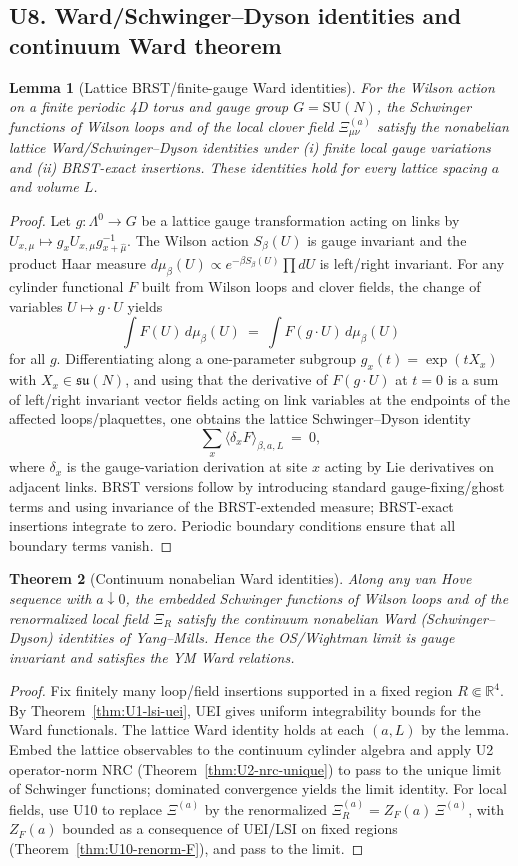 \documentclass[11pt]{amsart}
\theoremstyle{plain}
\newtheorem{theorem}{Theorem}[section]
\newtheorem{lemma}[theorem]{Lemma}
\theoremstyle{definition}
\theoremstyle{remark}
\begin{document}
\subsection{U8. Ward/Schwinger–Dyson identities and continuum Ward theorem}
\begin{lemma}[Lattice BRST/finite-gauge Ward identities]
For the Wilson action on a finite periodic 4D torus and gauge group $G=\mathrm{SU}(N)$, the Schwinger functions of Wilson loops and of the local clover field $\Xi^{(a)}_{\mu\nu}$ satisfy the nonabelian lattice Ward/Schwinger–Dyson identities under (i) finite local gauge variations and (ii) BRST-exact insertions. These identities hold for every lattice spacing $a$ and volume $L$.
\end{lemma}
\begin{proof}
Let $g: \Lambda^0\to G$ be a lattice gauge transformation acting on links by $U_{x,\mu}\mapsto g_x U_{x,\mu} g_{x+\hat\mu}^{-1}$. The Wilson action $S_\beta(U)$ is gauge invariant and the product Haar measure $d\mu_\beta(U)\propto e^{-\beta S_\beta(U)}\prod dU$ is left/right invariant. For any cylinder functional $F$ built from Wilson loops and clover fields, the change of variables $U\mapsto g\cdot U$ yields
\[
  \int F(U)\,d\mu_\beta(U)\ =\ \int F(g\cdot U)\,d\mu_\beta(U)
\]
for all $g$. Differentiating along a one-parameter subgroup $g_x(t)=\exp(t X_x)$ with $X_x\in\mathfrak{su}(N)$, and using that the derivative of $F(g\cdot U)$ at $t=0$ is a sum of left/right invariant vector fields acting on link variables at the endpoints of the affected loops/plaquettes, one obtains the lattice Schwinger–Dyson identity
\[
  \sum_{x}\Big\langle \delta_x F\Big\rangle_{\beta,a,L}\ =\ 0,
\]
where $\delta_x$ is the gauge-variation derivation at site $x$ acting by Lie derivatives on adjacent links. BRST versions follow by introducing standard gauge-fixing/ghost terms and using invariance of the BRST-extended measure; BRST-exact insertions integrate to zero. Periodic boundary conditions ensure that all boundary terms vanish.
\end{proof}
\begin{theorem}[Continuum nonabelian Ward identities]\label{thm:U8-ward-cont}
Along any van Hove sequence with $a\downarrow 0$, the embedded Schwinger functions of Wilson loops and of the renormalized local field $\Xi_R$ satisfy the continuum nonabelian Ward (Schwinger–Dyson) identities of Yang–Mills. Hence the OS/Wightman limit is gauge invariant and satisfies the YM Ward relations.
\end{theorem}
\begin{proof}
Fix finitely many loop/field insertions supported in a fixed region $R\Subset\mathbb R^4$. By Theorem~\ref{thm:U1-lsi-uei}, UEI gives uniform integrability bounds for the Ward functionals. The lattice Ward identity holds at each $(a,L)$ by the lemma. Embed the lattice observables to the continuum cylinder algebra and apply U2 operator-norm NRC (Theorem~\ref{thm:U2-nrc-unique}) to pass to the unique limit of Schwinger functions; dominated convergence yields the limit identity. For local fields, use U10 to replace $\Xi^{(a)}$ by the renormalized $\Xi^{(a)}_R=Z_F(a)\,\Xi^{(a)}$, with $Z_F(a)$ bounded as a consequence of UEI/LSI on fixed regions (Theorem~\ref{thm:U10-renorm-F}), and pass to the limit.
\end{proof}
\end{document}
